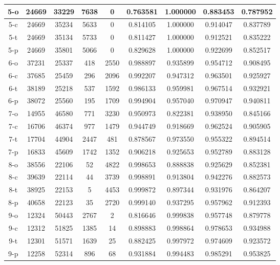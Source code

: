 \begin{longtable}[!h]{|c|c|c|c|c|c|c|c|c|}
	\hline	\rowcolor{bad} 5-o	&	24669	&	33229	&	7638	&	0	&	0.763581	&	1.000000	&	0.883453	&	0.787952	\\
	\hline	5-c	&	24669	&	35234	&	5633	&	0	&	0.814105	&	1.000000	&	0.914047	&	0.837789	\\
	\hline	5-t	&	24669	&	35134	&	5733	&	0	&	0.811427	&	1.000000	&	0.912521	&	0.835222	\\
	\hline	\rowcolor{closest} 5-p	&	24669	&	35801	&	5066	&	0	&	0.829628	&	1.000000	&	0.922699	&	0.852517	\\
	
	\hline	\rowcolor{bad} 6-o	&	37231	&	25337	&	418	&	2550	&	0.988897	&	0.935899	&	0.954712	&	0.908495	\\
	\hline	6-c	&	37685	&	25459	&	296	&	2096	&	0.992207	&	0.947312	&	0.963501	&	0.925927	\\
	\hline	6-t	&	38189	&	25218	&	537	&	1592	&	0.986133	&	0.959981	&	0.967514	&	0.932921	\\
	\hline	\rowcolor{closest} 6-p	&	38072	&	25560	&	195	&	1709	&	0.994904	&	0.957040	&	0.970947	&	0.940811	\\
	
	\hline	\rowcolor{bad} 7-o	&	14955	&	46580	&	771	&	3230	&	0.950973	&	0.822381	&	0.938950	&	0.845166	\\
	\hline	\rowcolor{closest} 7-c	&	16706	&	46374	&	977	&	1479	&	0.944749	&	0.918669	&	0.962524	&	0.905905	\\
	\hline	7-t	&	17704	&	44904	&	2447	&	481	&	0.878567	&	0.973550	&	0.955322	&	0.894514	\\
	\hline	7-p	&	16833	&	45609	&	1742	&	1352	&	0.906218	&	0.925653	&	0.952789	&	0.883128	\\
	
	\hline	\rowcolor{bad} 8-o	&	38556	&	22106	&	52	&	4822	&	0.998653	&	0.888838	&	0.925629	&	0.852381	\\
	\hline	8-c	&	39639	&	22114	&	44	&	3739	&	0.998891	&	0.913804	&	0.942276	&	0.882573	\\
	\hline	8-t	&	38925	&	22153	&	5	&	4453	&	0.999872	&	0.897344	&	0.931976	&	0.864207	\\
	\hline	\rowcolor{closest} 8-p	&	40658	&	22123	&	35	&	2720	&	0.999140	&	0.937295	&	0.957962	&	0.912393	\\
	
	\hline \rowcolor{bad} 9-o	&	12324	&	50443	&	2767	&	2	&	0.816646	&	0.999838	&	0.957748	&	0.879778	\\
	\hline	9-c	&	12312	&	51825	&	1385	&	14	&	0.898883	&	0.998864	&	0.978653	&	0.934988	\\
	\hline	9-t	&	12301	&	51571	&	1639	&	25	&	0.882425	&	0.997972	&	0.974609	&	0.923572	\\
	\hline	\rowcolor{closest} 9-p	&	12258	&	52314	&	896	&	68	&	0.931884	&	0.994483	&	0.985291	&	0.953825	\\
	

\end{longtable}
